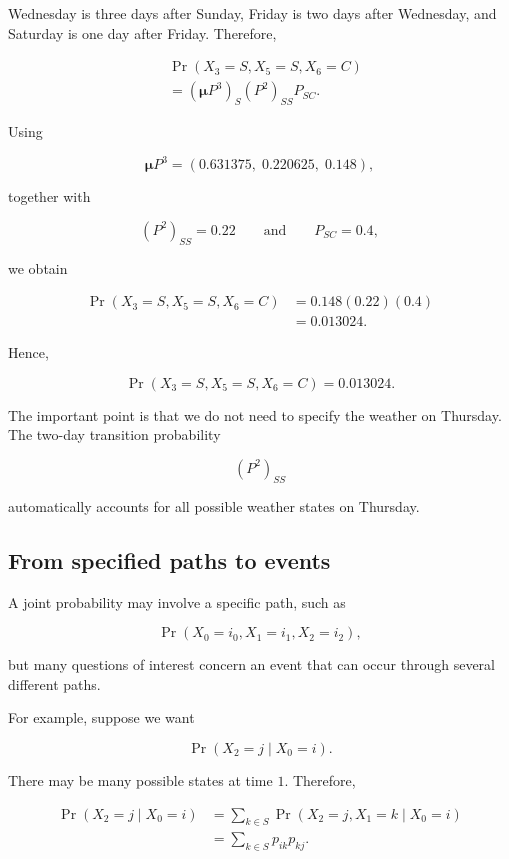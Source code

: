 \documentclass[
  letterpaper,
  DIV=11,
  numbers=noendperiod]{scrartcl}
\theoremstyle{definition}
\theoremstyle{remark}
\begin{document}
Wednesday is three days after Sunday, Friday is two days after
Wednesday, and Saturday is one day after Friday. Therefore,

\[
\begin{aligned}
&\Pr(X_3=S,X_5=S,X_6=C)\\
&=
(\boldsymbol{\mu}P^3)_S
(P^2)_{SS}
P_{SC}.
\end{aligned}
\]

Using

\[
\boldsymbol{\mu}P^3
=
(0.631375,\;0.220625,\;0.148),
\]

together with

\[
(P^2)_{SS}=0.22
\qquad\text{and}\qquad
P_{SC}=0.4,
\]

we obtain

\[
\begin{aligned}
\Pr(X_3=S,X_5=S,X_6=C)
&=
0.148(0.22)(0.4)\\
&=
0.013024.
\end{aligned}
\]

Hence,

\[
\boxed{
\Pr(X_3=S,X_5=S,X_6=C)=0.013024.
}
\]

The important point is that we do not need to specify the weather on
Thursday. The two-day transition probability

\[
(P^2)_{SS}
\]

automatically accounts for all possible weather states on Thursday.

\subsection{From specified paths to
events}\label{from-specified-paths-to-events}

A joint probability may involve a specific path, such as

\[
\Pr(X_0=i_0,X_1=i_1,X_2=i_2),
\]

but many questions of interest concern an event that can occur through
several different paths.

For example, suppose we want

\[
\Pr(X_2=j\mid X_0=i).
\]

There may be many possible states at time \(1\). Therefore,

\[
\begin{aligned}
\Pr(X_2=j\mid X_0=i)
&=
\sum_{k\in S}
\Pr(X_2=j,X_1=k\mid X_0=i)\\
&=
\sum_{k\in S}
p_{ik}p_{kj}.
\end{aligned}
\]
\end{document}
